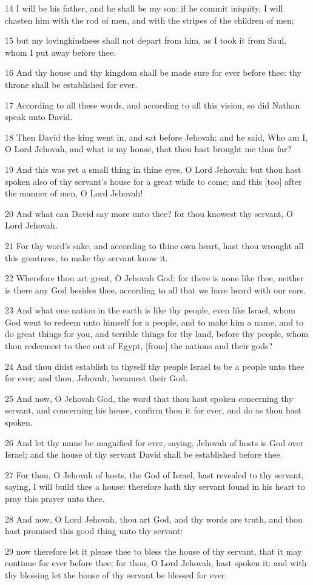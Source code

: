 \par 14 I will be his father, and he shall be my son: if he commit iniquity, I will chasten him with the rod of men, and with the stripes of the children of men;
\par 15 but my lovingkindness shall not depart from him, as I took it from Saul, whom I put away before thee.
\par 16 And thy house and thy kingdom shall be made sure for ever before thee: thy throne shall be established for ever.
\par 17 According to all these words, and according to all this vision, so did Nathan speak unto David.
\par 18 Then David the king went in, and sat before Jehovah; and he said, Who am I, O Lord Jehovah, and what is my house, that thou hast brought me thus far?
\par 19 And this was yet a small thing in thine eyes, O Lord Jehovah; but thou hast spoken also of thy servant's house for a great while to come; and this [too] after the manner of men, O Lord Jehovah!
\par 20 And what can David say more unto thee? for thou knowest thy servant, O Lord Jehovah.
\par 21 For thy word's sake, and according to thine own heart, hast thou wrought all this greatness, to make thy servant know it.
\par 22 Wherefore thou art great, O Jehovah God: for there is none like thee, neither is there any God besides thee, according to all that we have heard with our ears.
\par 23 And what one nation in the earth is like thy people, even like Israel, whom God went to redeem unto himself for a people, and to make him a name, and to do great things for you, and terrible things for thy land, before thy people, whom thou redeemest to thee out of Egypt, [from] the nations and their gods?
\par 24 And thou didst establish to thyself thy people Israel to be a people unto thee for ever; and thou, Jehovah, becamest their God.
\par 25 And now, O Jehovah God, the word that thou hast spoken concerning thy servant, and concerning his house, confirm thou it for ever, and do as thou hast spoken.
\par 26 And let thy name be magnified for ever, saying, Jehovah of hosts is God over Israel; and the house of thy servant David shall be established before thee.
\par 27 For thou, O Jehovah of hosts, the God of Israel, hast revealed to thy servant, saying, I will build thee a house: therefore hath thy servant found in his heart to pray this prayer unto thee.
\par 28 And now, O Lord Jehovah, thou art God, and thy words are truth, and thou hast promised this good thing unto thy servant:
\par 29 now therefore let it please thee to bless the house of thy servant, that it may continue for ever before thee; for thou, O Lord Jehovah, hast spoken it: and with thy blessing let the house of thy servant be blessed for ever.

